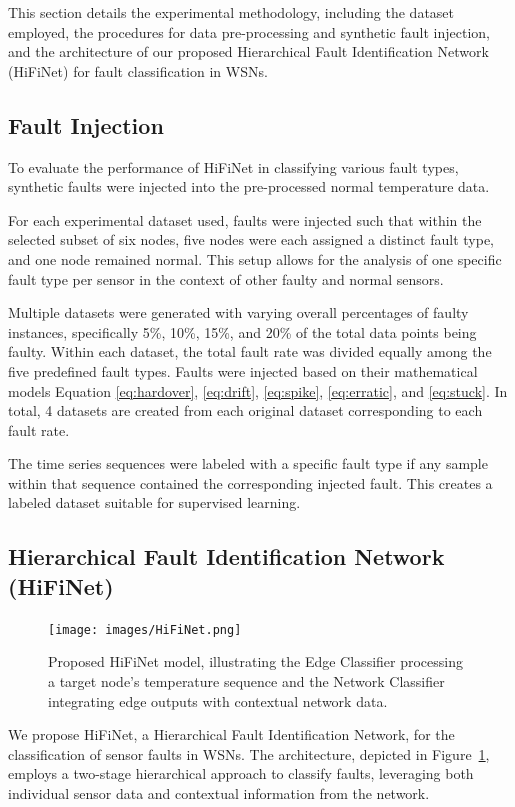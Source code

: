 This section details the experimental methodology, including the dataset employed, the procedures for data pre-processing and synthetic fault injection, and the architecture of our proposed Hierarchical Fault Identification Network (HiFiNet) for fault classification in WSNs.

\subsection{Fault Injection}
To evaluate the performance of HiFiNet in classifying various fault types, synthetic faults were injected into the pre-processed normal temperature data.

For each experimental dataset used, faults were injected such that within the selected subset of six nodes, five nodes were each assigned a distinct fault type, and one node remained normal. This setup allows for the analysis of one specific fault type per sensor in the context of other faulty and normal sensors.

Multiple datasets were generated with varying overall percentages of faulty instances, specifically 5\%, 10\%, 15\%, and 20\% of the total data points being faulty. Within each dataset, the total fault rate was divided equally among the five predefined fault types. Faults were injected based on their mathematical models Equation \ref{eq:hardover}, \ref{eq:drift}, \ref{eq:spike}, \ref{eq:erratic}, and \ref{eq:stuck}. In total, 4 datasets are created from each original dataset corresponding to each fault rate.

The time series sequences were labeled with a specific fault type if any sample within that sequence contained the corresponding injected fault. This creates a labeled dataset suitable for supervised learning.

\subsection{Hierarchical Fault Identification Network (HiFiNet)}
\begin{figure}
  \centering
  \texttt{[image: images/HiFiNet.png]}
  \caption{Proposed HiFiNet model, illustrating the Edge Classifier processing a target node's temperature sequence and the Network Classifier integrating edge outputs with contextual network data.}
  \label{fig:hifinet}
\end{figure}
We propose HiFiNet, a Hierarchical Fault Identification Network, for the classification of sensor faults in WSNs. The architecture, depicted in Figure~\ref{fig:hifinet}, employs a two-stage hierarchical approach to classify faults, leveraging both individual sensor data and contextual information from the network.

